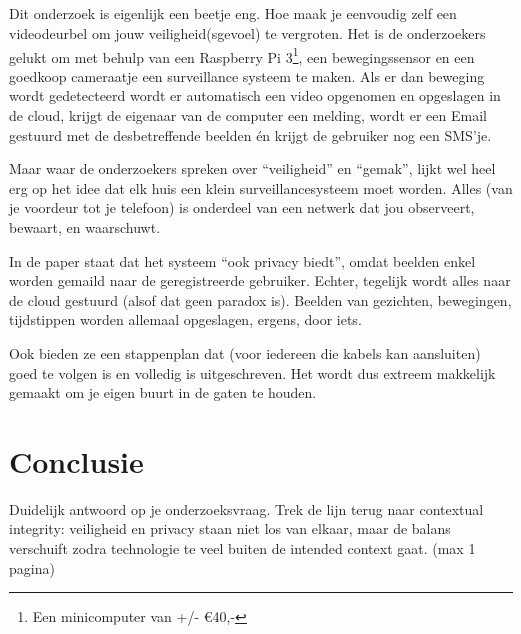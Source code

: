 \documentclass[nonacm,sigconf]{acmart}
\begin{document}
    \subsection{}

    \parencite{lalitha2019smart} Dit onderzoek is eigenlijk een beetje eng.
    Hoe maak je eenvoudig zelf een videodeurbel om jouw veiligheid(sgevoel) te vergroten.
    Het is de onderzoekers gelukt om met behulp van een Raspberry Pi 3\footnote{Een minicomputer van +/- €40,-}, een bewegingssensor en een goedkoop cameraatje een surveillance systeem te maken.
    Als er dan beweging wordt gedetecteerd wordt er automatisch een video opgenomen en opgeslagen in de cloud, krijgt de eigenaar van de computer een melding, wordt er een Email gestuurd met de desbetreffende beelden én krijgt de gebruiker nog een SMS'je.

    Maar waar de onderzoekers spreken over “veiligheid” en “gemak”, lijkt wel heel erg op het idee dat elk huis een klein surveillancesysteem moet worden.
    Alles (van je voordeur tot je telefoon) is onderdeel van een netwerk dat jou observeert, bewaart, en waarschuwt.

    In de paper staat dat het systeem “ook privacy biedt”, omdat beelden enkel worden gemaild naar de geregistreerde gebruiker.
    Echter, tegelijk wordt alles naar de cloud gestuurd (alsof dat geen paradox is).
    Beelden van gezichten, bewegingen, tijdstippen worden allemaal opgeslagen, ergens, door iets.

    Ook bieden ze een stappenplan dat (voor iedereen die kabels kan aansluiten) goed te volgen is en volledig is uitgeschreven.
    Het wordt dus extreem makkelijk gemaakt om je eigen buurt in de gaten te houden.

    \section{Conclusie}
    Duidelijk antwoord op je onderzoeksvraag.
    Trek de lijn terug naar contextual integrity: veiligheid en privacy staan niet los van elkaar, maar de balans verschuift zodra technologie te veel buiten de intended context gaat. (max 1 pagina)

    \printbibliography

    \balance %
\end{document}
